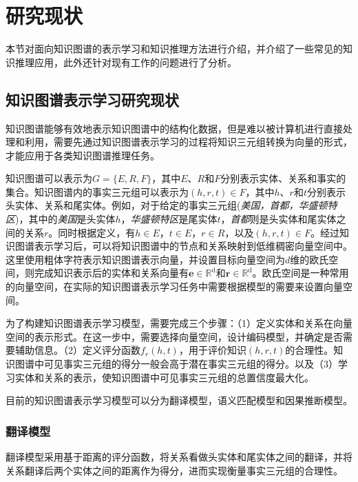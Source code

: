 \documentclass[algorithmlist, AutoFakeBold, AutoFakeSlant, figurelist, tablelist, nomlist, engineering]{seuthesix}
\begin{document}
\section{研究现状}
本节对面向知识图谱的表示学习和知识推理方法进行介绍，并介绍了一些常见的知识推理应用，此外还针对现有工作的问题进行了分析。

\subsection{知识图谱表示学习研究现状}
知识图谱能够有效地表示知识图谱中的结构化数据，但是难以被计算机进行直接处理和利用，需要先通过知识图谱表示学习的过程将知识三元组转换为向量的形式，才能应用于各类知识图谱推理任务。

知识图谱可以表示为$G=\{E, R, F\}$，其中$E$、$R$和$F$分别表示实体、关系和事实的集合。知识图谱内的事实三元组可以表示为$(h, r, t) \in F$，其中$h$、$r$和$t$分别表示头实体、关系和尾实体。例如，对于给定的事实三元组(\textit{美国，首都，华盛顿特区})，其中的\textit{美国}是头实体$h$，\textit{华盛顿特区}是尾实体$t$，\textit{首都}则是头实体和尾实体之间的关系$r$。同时根据定义，有$h \in E$，$t \in E$，$r \in R$，以及$(h, r, t) \in F$。经过知识图谱表示学习后，可以将知识图谱中的节点和关系映射到低维稠密向量空间中。
这里使用粗体字符表示知识图谱表示向量，并设置目标向量空间为$d$维的欧氏空间，则完成知识表示后的实体和关系向量有$\bm{e} \in \mathbb{R}^{\mathrm{d}}$和$\bm{r} \in \mathbb{R}^{\mathrm{d}}$。欧氏空间是一种常用的向量空间，在实际的知识图谱表示学习任务中需要根据模型的需要来设置向量空间。

为了构建知识图谱表示学习模型，需要完成三个步骤：（1）定义实体和关系在向量空间的表示形式。在这一步中，需要选择向量空间，设计编码模型，并确定是否需要辅助信息。（2）定义评分函数$f_r(h, t)$，用于评价知识$(h, r, t)$的合理性。知识图谱中可见事实三元组的得分一般会高于潜在事实三元组的得分。以及（3）学习实体和关系的表示，使知识图谱中可见事实三元组的总置信度最大化。

目前的知识图谱表示学习模型可以分为翻译模型，语义匹配模型和因果推断模型。

\subsubsection{翻译模型}
翻译模型采用基于距离的评分函数，将关系看做头实体和尾实体之间的翻译，并将关系翻译后两个实体之间的距离作为得分，进而实现衡量事实三元组的合理性。
\end{document}
